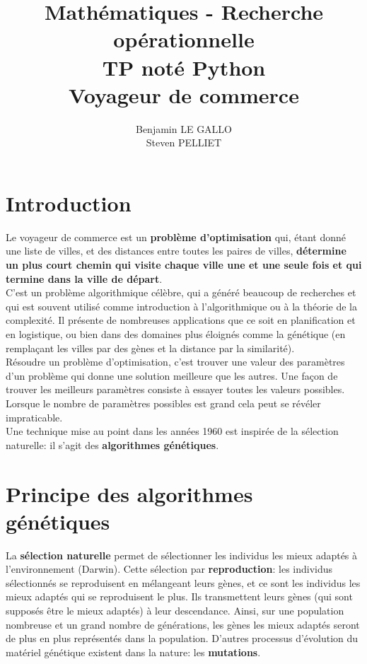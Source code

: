 \documentclass[a4paper,10pt]{report}
\title{Mathématiques - Recherche opérationnelle \\
TP noté Python \\
\textbf{Voyageur de commerce}}
\author{Benjamin LE GALLO \\
Steven PELLIET}
\begin{document}
\maketitle

\chapter*{Introduction}
 
Le voyageur de commerce est un \textbf{problème d'optimisation} qui, étant donné une liste de villes, 
et des distances entre toutes les paires de villes, \textbf{détermine un plus court chemin qui visite chaque ville 
une et une seule fois et qui termine dans la ville de départ}. \\

C'est un problème algorithmique célèbre, qui a généré beaucoup de recherches et qui est souvent utilisé comme 
introduction à l'algorithmique ou à la théorie de la complexité. Il présente de nombreuses applications que ce soit 
en planification et en logistique, ou bien dans des domaines plus éloignés comme la génétique 
(en remplaçant les villes par des gènes et la distance par la similarité). \\

Résoudre un problème d'optimisation, c'est trouver une valeur des paramètres d'un problème qui donne une solution 
meilleure que les autres. Une façon de trouver les meilleurs paramètres consiste à essayer toutes les valeurs possibles.
Lorsque le nombre de paramètres possibles est grand cela peut se révéler impraticable.\\

Une technique mise au point dans les années 1960 est inspirée de la sélection naturelle: il s'agit 
des \textbf{algorithmes génétiques}. \\
 
\chapter*{Principe des algorithmes génétiques}

La \textbf{sélection naturelle} permet de sélectionner les individus les mieux adaptés à l'environnement (Darwin). Cette sélection
par \textbf{reproduction}: les individus sélectionnés se reproduisent en mélangeant leurs gènes, et ce sont les individus les mieux 
adaptés qui se reproduisent le plus. Ils transmettent leurs gènes (qui sont supposés être le mieux adaptés) à leur descendance.
Ainsi, sur une population nombreuse et un grand nombre de générations, les gènes les mieux adaptés seront de plus en plus
représentés dans la population. D'autres processus d'évolution du matériel génétique existent dans la nature: les \textbf{mutations}. \\
\end{document}
